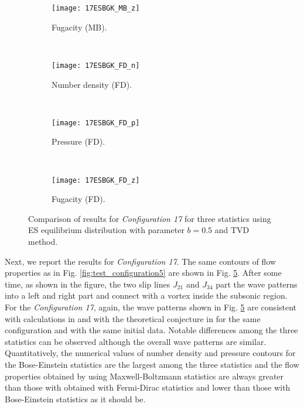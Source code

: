 \documentclass{rsproca}%
\begin{document}
\begin{figure}
\begin{subfigure}[b]{0.32\textwidth}
                \centering
                \texttt{[image: 17ESBGK\_MB\_z]}
                \caption{Fugacity (MB).}
                \label{fig:17ESBGK_MB_z}
        \end{subfigure}
        ~ %
        \begin{subfigure}[b]{0.32\textwidth}
                \centering
                \texttt{[image: 17ESBGK\_FD\_n]}
                \caption{Number density (FD).}
                \label{fig:17ESBGK_FD_n}
        \end{subfigure}
        ~ %
        \begin{subfigure}[b]{0.32\textwidth}
                \centering
                \texttt{[image: 17ESBGK\_FD\_p]}
                \caption{Pressure (FD).}
                \label{fig:17ESBGK_FD_p}
        \end{subfigure}
				~ %
        \begin{subfigure}[b]{0.32\textwidth}
                \centering
                \texttt{[image: 17ESBGK\_FD\_z]}
                \caption{Fugacity (FD).}
                \label{fig:17ESBGK_FD_z}
        \end{subfigure}
				\caption{Comparison of results for \emph{Configuration 17} for three statistics using ES equilibrium distribution with parameter $b=0.5$ and TVD method.}
				\label{fig:test_configuration17}
\end{figure}

Next, we report the results for \emph{Configuration 17}. The same contours of flow properties as in Fig. \ref{fig:test_configuration5} are shown in Fig. \ref{fig:test_configuration17}.  After some time, as shown in the figure, the two slip lines $J_{21}$ and $J_{34}$ part the wave patterns into a left and right part and connect with a vortex inside the subsonic region.
For the \emph{Configuration 17}, again, the wave patterns shown in Fig. \ref{fig:test_configuration17} are consistent with calculations in \cite{Laxliu95}\cite{schultzrinne} and  with the theoretical conjecture in \cite{ZhangZheng90} for the same configuration and with the same initial data.   Notable differences among the three statistics can be observed although the overall wave patterns are similar.  Quantitatively, the numerical values of number density and pressure contours for the Bose-Einstein statistics are the largest among the three statistics and the flow properties obtained by using Maxwell-Boltzmann statistics are always greater than those with obtained with Fermi-Dirac statistics and lower than those with Bose-Einstein statistics as it should be.
\end{document}
